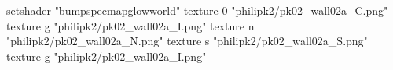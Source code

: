 setshader "bumpspecmapglowworld"
    texture 0 "philipk2/pk02_wall02a_C.png"
    texture g "philipk2/pk02_wall02a_I.png"
    texture n "philipk2/pk02_wall02a_N.png"
    texture s "philipk2/pk02_wall02a_S.png"
    texture g "philipk2/pk02_wall02a_I.png"